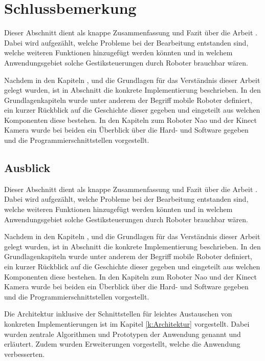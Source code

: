 \chapter{Schlussbemerkung}
Dieser Abschnitt dient als knappe Zusammenfassung und Fazit über die Arbeit \Titel. Dabei wird aufgezählt, welche Probleme bei der Bearbeitung entstanden sind, welche weiteren Funktionen hinzugefügt werden könnten und in welchem Anwendungsgebiet solche Gestiksteuerungen durch Roboter brauchbar wären.

Nachdem in den Kapiteln ,  und  die Grundlagen für das Verständnis dieser Arbeit gelegt wurden, ist in Abschnitt  die konkrete Implementierung beschrieben. In den Grundlagenkapiteln wurde unter anderem der Begriff mobile Roboter definiert, ein kurzer Rückblick auf die Geschichte dieser gegeben und eingeteilt aus welchen Komponenten diese bestehen. In den Kapiteln zum Roboter Nao und der Kinect Kamera wurde bei beiden ein Überblick über die Hard- und Software gegeben und die Programmierschnittstellen vorgestellt.


\section{Ausblick}      %
Dieser Abschnitt dient als knappe Zusammenfassung und Fazit über die Arbeit \Titel. Dabei wird aufgezählt, welche Probleme bei der Bearbeitung entstanden sind, welche weiteren Funktionen hinzugefügt werden könnten und in welchem Anwendungsgebiet solche Gestiksteuerungen durch Roboter brauchbar wären.

Nachdem in den Kapiteln ,  und  die Grundlagen für das Verständnis dieser Arbeit gelegt wurden, ist in Abschnitt  die konkrete Implementierung beschrieben. In den Grundlagenkapiteln wurde unter anderem der Begriff mobile Roboter definiert, ein kurzer Rückblick auf die Geschichte dieser gegeben und eingeteilt aus welchen Komponenten diese bestehen. In den Kapiteln zum Roboter Nao und der Kinect Kamera wurde bei beiden ein Überblick über die Hard- und Software gegeben und die Programmierschnittstellen vorgestellt.

Die Architektur inklusive der Schnittstellen für leichtes Austauschen von konkreten Implementierungen ist im Kapitel \ref{k:Architektur} vorgestellt. Dabei wurden zentrale Algorithmen und Prototypen der Anwendung genannt und erläutert. Zudem wurden Erweiterungen vorgestellt, welche die Anwendung verbesserten.


